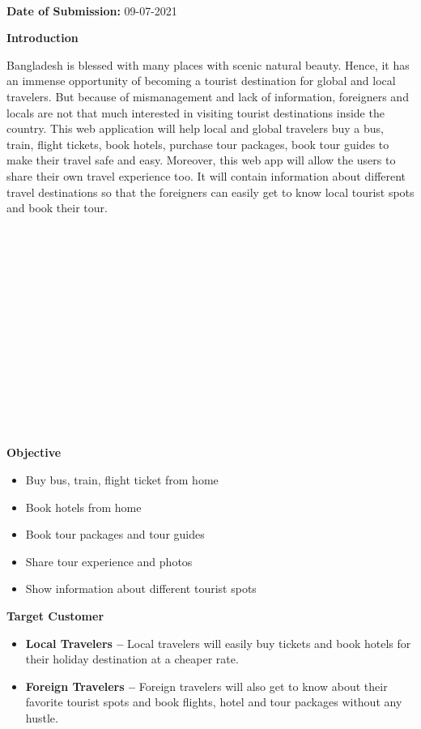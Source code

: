 \documentclass[]{article}
\begin{document}
\textbf{\\Date of Submission:} 09-07-2021



\pagebreak




\textbf{\Large Introduction}


Bangladesh is blessed with many places with scenic natural beauty. Hence, it has an immense opportunity of becoming a tourist destination for global and local travelers. But because of mismanagement and lack of information, foreigners and locals are not that much interested in visiting tourist destinations inside the country. This web application will help local and global travelers buy a bus, train, flight tickets, book hotels, purchase tour packages, book tour guides to make their travel safe and easy. Moreover, this web app will allow the users to share their own travel experience too. It will contain information about different travel destinations so that the foreigners can easily get to know local tourist spots and book their tour.

\\\\\\\\\\\\\\\\\\\\\\\\\

\textbf{\Large Objective}

\begin{itemize}
\item
  Buy bus, train, flight ticket from home
\item
  Book hotels from home
\item
  Book tour packages and tour guides
\item
  Share tour experience and photos
\item
  Show information about different tourist spots
\newline

\end{itemize}



\textbf{\Large Target Customer}

\begin{itemize}
\item
  \textbf{Local Travelers --} Local travelers will easily buy tickets
  and book hotels for their holiday destination at a cheaper rate.
\item
  \textbf{Foreign Travelers --} Foreign travelers will also get to know
  about their favorite tourist spots and book flights, hotel and tour
  packages without any hustle.
  \newline

\end{itemize}
\end{document}
